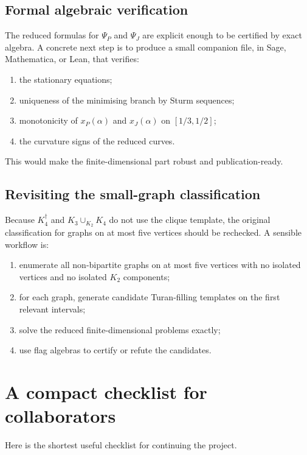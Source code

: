 \documentclass[11pt]{amsart}
\theoremstyle{definition}
\newcommand{\1}{\mathbf 1}
\begin{document}
\subsection{Formal algebraic verification}

The reduced formulas for $\Psi_P$ and $\Psi_J$ are explicit enough to be certified by exact algebra.  A concrete next step is to produce a small companion file, in Sage, Mathematica, or Lean, that verifies:
\begin{enumerate}[label=(\roman*)]
\item the stationary equations;
\item uniqueness of the minimising branch by Sturm sequences;
\item monotonicity of $x_P(\alpha)$ and $x_J(\alpha)$ on $[1/3,1/2]$;
\item the curvature signs of the reduced curves.
\end{enumerate}
This would make the finite-dimensional part robust and publication-ready.

\subsection{Revisiting the small-graph classification}

Because $K_4^\dagger$ and $K_3\cup_{K_2}K_4$ do not use the clique template, the original classification for graphs on at most five vertices should be rechecked.  A sensible workflow is:
\begin{enumerate}[label=(\arabic*)]
\item enumerate all non-bipartite graphs on at most five vertices with no isolated vertices and no isolated $K_2$ components;
\item for each graph, generate candidate Turan-filling templates on the first relevant intervals;
\item solve the reduced finite-dimensional problems exactly;
\item use flag algebras to certify or refute the candidates.
\end{enumerate}

\section{A compact checklist for collaborators}

Here is the shortest useful checklist for continuing the project.
\end{document}
